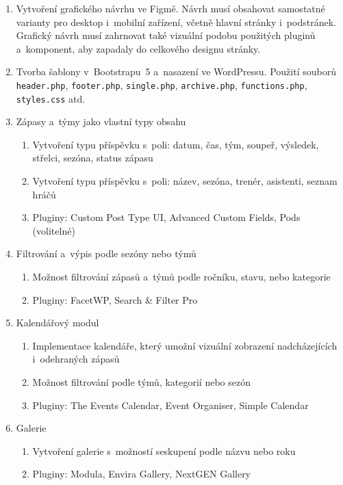 \documentclass[12pt,a4paper]{article}
\begin{document}
\begin{enumerate}
    \item Vytvoření grafického návrhu ve Figmě. Návrh musí obsahovat samostatné varianty pro desktop i~mobilní zařízení, včetně hlavní stránky i~podstránek. Grafický návrh musí zahrnovat také vizuální podobu použitých pluginů a~komponent, aby zapadaly do celkového designu stránky.

    \item Tvorba šablony v~Bootstrapu~5 a~nasazení ve WordPressu. Použití souborů \texttt{header.php}, \texttt{footer.php}, \texttt{single.php}, \texttt{archive.php}, \texttt{functions.php}, \texttt{styles.css} atd.

    \item Zápasy a~týmy jako vlastní typy obsahu
    \begin{enumerate}[label=\alph*)]
        \item Vytvoření typu příspěvku  s~poli: datum, čas, tým, soupeř, výsledek, střelci, sezóna, status zápasu
        \item Vytvoření typu příspěvku  s~poli: název, sezóna, trenér, asistenti, seznam hráčů
        \item Pluginy: Custom Post Type UI, Advanced Custom Fields, Pods (volitelné)
    \end{enumerate}

    \item Filtrování a~výpis podle sezóny nebo týmů
    \begin{enumerate}[label=\alph*)]
        \item Možnost filtrování zápasů a~týmů podle ročníku, stavu, nebo kategorie
        \item Pluginy: FacetWP, Search \& Filter Pro
    \end{enumerate}

    \item Kalendářový modul
    \begin{enumerate}[label=\alph*)]
        \item Implementace kalendáře, který umožní vizuální zobrazení nadcházejících i~odehraných zápasů
        \item Možnost filtrování podle týmů, kategorií nebo sezón
        \item Pluginy: The Events Calendar, Event Organiser, Simple Calendar
    \end{enumerate}

    \item Galerie
    \begin{enumerate}[label=\alph*)]
        \item Vytvoření galerie s~možností seskupení podle názvu nebo roku
        \item Pluginy: Modula, Envira Gallery, NextGEN Gallery
    \end{enumerate}


\end{enumerate}
\end{document}

